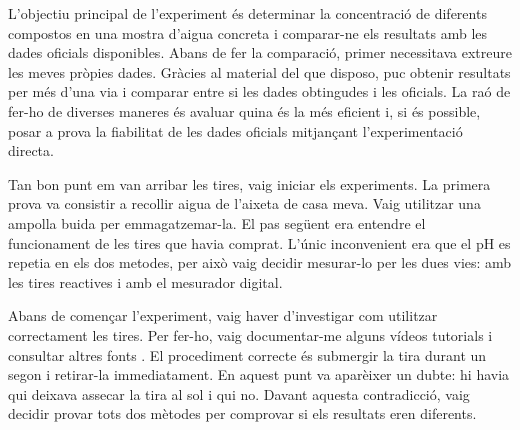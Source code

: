 
L’objectiu principal de l'experiment és determinar la concentració de diferents compostos en una mostra d’aigua concreta i comparar-ne els resultats amb les dades oficials disponibles. Abans de fer la comparació, primer necessitava extreure les meves pròpies dades. Gràcies al material del que disposo, puc obtenir resultats per més d’una via i comparar entre si les dades obtingudes i les oficials. La raó de fer-ho de diverses maneres és avaluar quina és la més eficient i, si és possible, posar a prova la fiabilitat de les dades oficials mitjançant l’experimentació directa.

Tan bon punt em van arribar les tires, vaig iniciar els experiments. La primera prova va consistir a recollir aigua de l’aixeta de casa meva. Vaig utilitzar una ampolla buida per emmagatzemar-la. El pas següent era entendre el funcionament de les tires que havia comprat. L’únic inconvenient era que el pH es repetia en els dos metodes, per això vaig decidir mesurar-lo per les dues vies: amb les tires reactives i amb el mesurador digital.



Abans de començar l'experiment, vaig haver d’investigar com utilitzar correctament les tires. Per fer-ho, vaig documentar-me alguns vídeos tutorials \cite{???} i consultar altres fonts \cite{???}. El procediment correcte és submergir la tira durant un segon i retirar-la immediatament. En aquest punt va aparèixer un dubte: hi havia qui deixava assecar la tira al sol i qui no. Davant aquesta contradicció, vaig decidir provar tots dos mètodes per comprovar si els resultats eren diferents.

